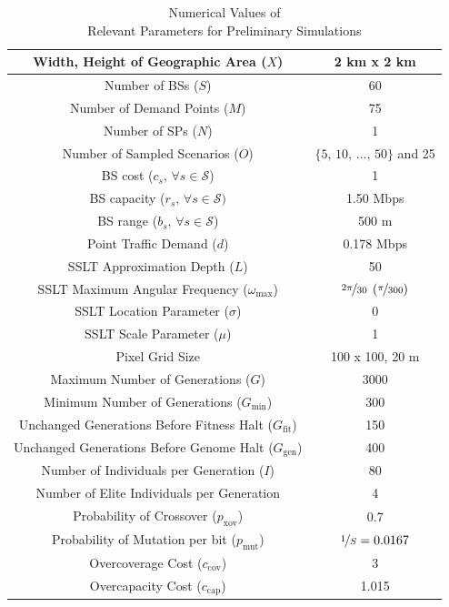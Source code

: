 \documentclass[12pt,dvipsnames]{report}
\begin{document}
\begin{table}[htp]
\centering
\caption{Numerical Values of\\Relevant Parameters for Preliminary Simulations}
\begin{tabular}{|c|c|} 
\hline
Width, Height of Geographic Area ($X$) & 2 km x 2 km \\
\hline
Number of BSs ($S$) & 60 \\ 
\hline 
Number of Demand Points ($M$) & 75 \\ 
\hline 
Number of SPs ($N$) & 1 \\
\hline
Number of Sampled Scenarios ($O$) & $\{5,\, 10,\, \ldots,\, 50\}$ and 25 \\ 
\hline 
BS cost ($c_s,\, \forall s \in \mathcal{S}$) & 1 \\ 
\hline 
BS capacity ($r_s,\, \forall s \in \mathcal{S})$ & 1.50 Mbps \\ 
\hline
BS range ($b_s,\, \forall s \in \mathcal{S}$) & 500 m \\
\hline 
Point Traffic Demand ($d$) & 0.178 Mbps \\ 
\hline 
\hline
SSLT Approximation Depth ($L$) & 50 \\ 
\hline
SSLT Maximum Angular Frequency ($\omega_{\max}$) & $\nicefrac{2 \pi}{30} \; \left( \nicefrac{\pi}{300} \right)$ \\
\hline 
SSLT Location Parameter ($\sigma$) & 0 \\ 
\hline 
SSLT Scale Parameter ($\mu$) & 1 \\ 
\hline
Pixel Grid Size & 100 x 100, 20 m \\
\hline 
\hline
Maximum Number of Generations ($G$) & 3000 \\ 
\hline
Minimum Number of Generations ($G_{\min}$) & 300 \\
\hline
Unchanged Generations Before Fitness Halt ($G_{\text{fit}}$) & 150 \\
\hline 
Unchanged Generations Before Genome Halt ($G_{\text{gen}}$) & 400 \\
\hline 
Number of Individuals per Generation ($I$) & 80 \\ 
\hline
Number of Elite Individuals per Generation & 4 \\
\hline 
Probability of Crossover ($p_\text{xov}$) & 0.7 \\ 
\hline
Probability of Mutation per bit ($p_\text{mut}$) & $\nicefrac{1}{S} = 0.0167$ \\
\hline 
Overcoverage Cost ($c_\text{cov}$) & 3 \\
\hline
Overcapacity Cost ($c_\text{cap}$) & 1.015 \\
\hline
\end{tabular}
\label{tab:Prelim_simval}
\end{table}
\end{document}
